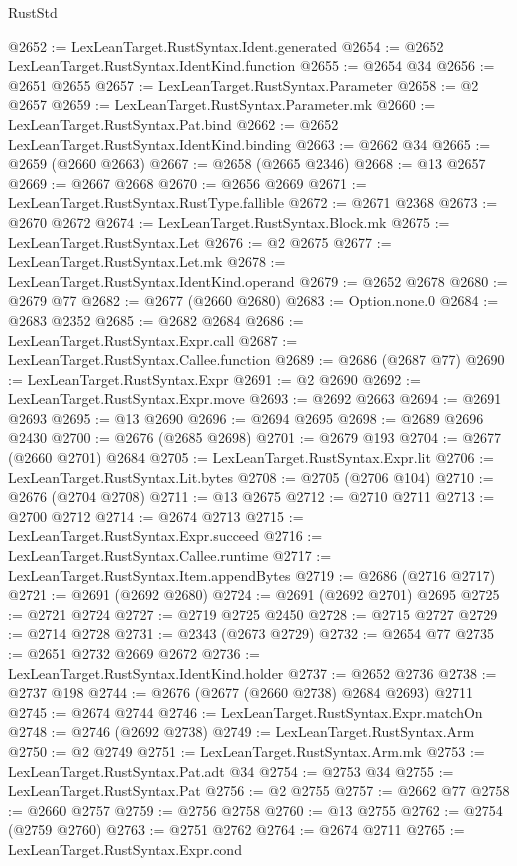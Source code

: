 \begin{lexlean}{RustStd}
\begin{coremodule}
@2652 := LexLeanTarget.RustSyntax.Ident.generated
@2654 := @2652 LexLeanTarget.RustSyntax.IdentKind.function
@2655 := @2654 @34
@2656 := @2651 @2655
@2657 := LexLeanTarget.RustSyntax.Parameter
@2658 := @2 @2657
@2659 := LexLeanTarget.RustSyntax.Parameter.mk
@2660 := LexLeanTarget.RustSyntax.Pat.bind
@2662 := @2652 LexLeanTarget.RustSyntax.IdentKind.binding
@2663 := @2662 @34
@2665 := @2659 (@2660 @2663)
@2667 := @2658 (@2665 @2346)
@2668 := @13 @2657
@2669 := @2667 @2668
@2670 := @2656 @2669
@2671 := LexLeanTarget.RustSyntax.RustType.fallible
@2672 := @2671 @2368
@2673 := @2670 @2672
@2674 := LexLeanTarget.RustSyntax.Block.mk
@2675 := LexLeanTarget.RustSyntax.Let
@2676 := @2 @2675
@2677 := LexLeanTarget.RustSyntax.Let.mk
@2678 := LexLeanTarget.RustSyntax.IdentKind.operand
@2679 := @2652 @2678
@2680 := @2679 @77
@2682 := @2677 (@2660 @2680)
@2683 := Option.none.{0}
@2684 := @2683 @2352
@2685 := @2682 @2684
@2686 := LexLeanTarget.RustSyntax.Expr.call
@2687 := LexLeanTarget.RustSyntax.Callee.function
@2689 := @2686 (@2687 @77)
@2690 := LexLeanTarget.RustSyntax.Expr
@2691 := @2 @2690
@2692 := LexLeanTarget.RustSyntax.Expr.move
@2693 := @2692 @2663
@2694 := @2691 @2693
@2695 := @13 @2690
@2696 := @2694 @2695
@2698 := @2689 @2696 @2430
@2700 := @2676 (@2685 @2698)
@2701 := @2679 @193
@2704 := @2677 (@2660 @2701) @2684
@2705 := LexLeanTarget.RustSyntax.Expr.lit
@2706 := LexLeanTarget.RustSyntax.Lit.bytes
@2708 := @2705 (@2706 @104)
@2710 := @2676 (@2704 @2708)
@2711 := @13 @2675
@2712 := @2710 @2711
@2713 := @2700 @2712
@2714 := @2674 @2713
@2715 := LexLeanTarget.RustSyntax.Expr.succeed
@2716 := LexLeanTarget.RustSyntax.Callee.runtime
@2717 := LexLeanTarget.RustSyntax.Item.appendBytes
@2719 := @2686 (@2716 @2717)
@2721 := @2691 (@2692 @2680)
@2724 := @2691 (@2692 @2701) @2695
@2725 := @2721 @2724
@2727 := @2719 @2725 @2450
@2728 := @2715 @2727
@2729 := @2714 @2728
@2731 := @2343 (@2673 @2729)
@2732 := @2654 @77
@2735 := @2651 @2732 @2669 @2672
@2736 := LexLeanTarget.RustSyntax.IdentKind.holder
@2737 := @2652 @2736
@2738 := @2737 @198
@2744 := @2676 (@2677 (@2660 @2738) @2684 @2693) @2711
@2745 := @2674 @2744
@2746 := LexLeanTarget.RustSyntax.Expr.matchOn
@2748 := @2746 (@2692 @2738)
@2749 := LexLeanTarget.RustSyntax.Arm
@2750 := @2 @2749
@2751 := LexLeanTarget.RustSyntax.Arm.mk
@2753 := LexLeanTarget.RustSyntax.Pat.adt @34
@2754 := @2753 @34
@2755 := LexLeanTarget.RustSyntax.Pat
@2756 := @2 @2755
@2757 := @2662 @77
@2758 := @2660 @2757
@2759 := @2756 @2758
@2760 := @13 @2755
@2762 := @2754 (@2759 @2760)
@2763 := @2751 @2762
@2764 := @2674 @2711
@2765 := LexLeanTarget.RustSyntax.Expr.cond

\end{coremodule}
\end{lexlean}
